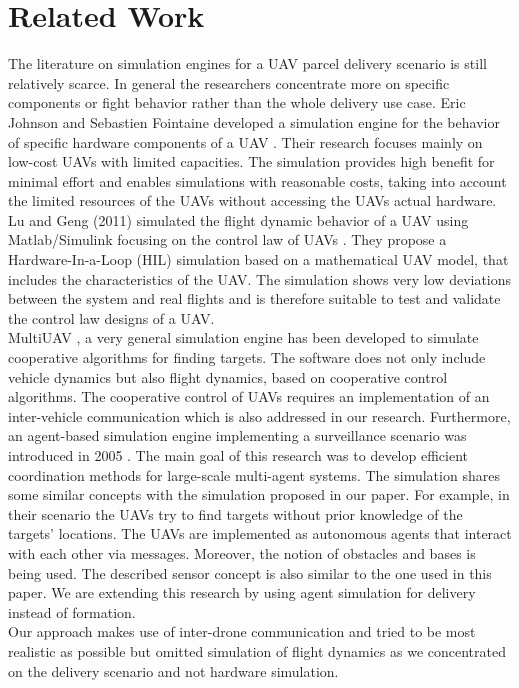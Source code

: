 \section{Related Work}
The literature on simulation engines for a UAV parcel delivery scenario is still relatively scarce. In general the researchers concentrate more on specific components or fight behavior rather than the whole delivery use case. Eric Johnson and Sebastien Fointaine developed a simulation engine for the behavior of specific hardware components of a UAV \cite{johnson.2001}. Their research focuses mainly on low-cost UAVs with limited capacities. The simulation provides high benefit for minimal effort and enables simulations with reasonable costs, taking into account the limited resources of the UAVs without accessing the UAVs actual hardware. Lu and Geng (2011) simulated the flight dynamic behavior of a UAV using Matlab/Simulink focusing on the control law of UAVs \cite{lu.2011}. They propose a Hardware-In-a-Loop (HIL) simulation based on a mathematical UAV model, that includes the characteristics of the UAV. The simulation shows very low deviations between the system and real flights and is therefore suitable to test and validate the control law designs of a UAV. \\
MultiUAV \cite{rasmussen.2003}, a very general simulation engine has been developed to simulate cooperative algorithms for finding targets. The software does not only include vehicle dynamics but also flight dynamics, based on cooperative control algorithms. The cooperative control of UAVs requires an implementation of an inter-vehicle communication which is also addressed in our research. Furthermore, an agent-based simulation engine implementing a surveillance scenario was introduced in 2005 \cite{jang.2005}. The main goal of this research was to develop efficient coordination methods for large-scale multi-agent systems. The simulation shares some similar concepts with the simulation proposed in our paper. For example, in their scenario the UAVs try to find targets without prior knowledge of the targets’ locations. The UAVs are implemented as autonomous agents that interact with each other via messages. Moreover, the notion of obstacles and bases is being used. The described sensor concept is also similar to the one used in this paper. We are extending this research by using agent simulation for delivery instead of formation.\\
Our approach makes use of inter-drone communication and tried to be most realistic as possible but omitted simulation of flight dynamics as we concentrated on the delivery scenario and not hardware simulation. 

